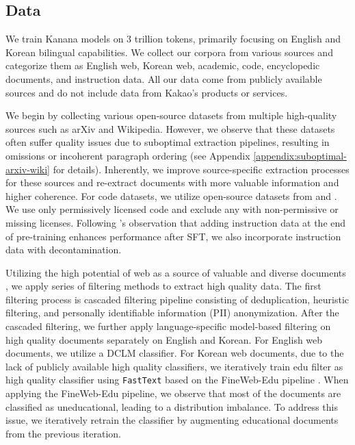 \subsection{Data}
\label{subsec:pretrain_data}

We train Kanana models on 3 trillion tokens, primarily focusing on English and Korean bilingual capabilities.
We collect our corpora from various sources and categorize them as English web, Korean web, academic, code, encyclopedic documents, and instruction data. 
All our data come from publicly available sources and do not include data from Kakao's products or services.

We begin by collecting various open-source datasets from multiple high-quality sources such as arXiv and Wikipedia.
However, we observe that these datasets often suffer quality issues due to suboptimal extraction pipelines, resulting in omissions or incoherent paragraph ordering (see Appendix \ref{appendix:suboptimal-arxiv-wiki} for details).
Inherently, we improve source-specific extraction processes for these sources and re-extract documents with more valuable information and higher coherence.
For code datasets, we utilize open-source datasets from \citet{starcoder} and \citet{starcoder2}. We use only permissively licensed code and exclude any with non-permissive or missing licenses.
Following \citet{inf-llm}'s observation that adding instruction data at the end of pre-training enhances performance after SFT, we also incorporate instruction data with decontamination.

Utilizing the high potential of web as a source of valuable and diverse documents \citep{dclm, nemotron-cc, deepseekmath}, we apply series of filtering methods to extract high quality data.
The first filtering process is cascaded filtering pipeline \citep{yi, llama3, dclm, gemma, fineweb-edu} consisting of deduplication, heuristic filtering, and personally identifiable information (PII) anonymization. 
After the cascaded filtering, we further apply language-specific model-based filtering on high quality documents \citep{nemotron-cc, deepseekmath, dclm, fineweb-edu} separately on English and Korean. 
For English web documents, we utilize a DCLM \citep{dclm} classifier.
For Korean web documents, due to the lack of publicly available high quality classifiers, we iteratively train edu filter as high quality classifier using \texttt{FastText} \citep{fasttext} based on the FineWeb-Edu pipeline \citep{fineweb-edu}.
When applying the FineWeb-Edu pipeline, we observe that most of the documents are classified as uneducational, leading to a distribution imbalance.
To address this issue, we iteratively retrain the classifier by augmenting educational documents from the previous iteration.

